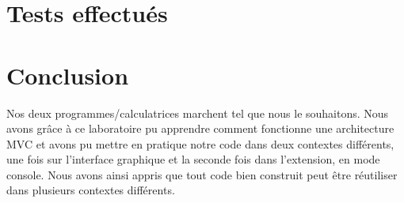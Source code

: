 \documentclass[12pt]{report}
\begin{document}
    \section*{Tests effectués}

    \section*{Conclusion}
        Nos deux programmes/calculatrices marchent tel que nous le souhaitons. Nous avons grâce à ce laboratoire pu apprendre
    comment fonctionne une architecture MVC et avons pu mettre en pratique notre code dans deux contextes différents, une fois sur
    l'interface graphique et la seconde fois dans l'extension, en mode console. \newline Nous avons ainsi appris que tout code bien construit
    peut être réutiliser dans plusieurs contextes différents.
\end{document}
